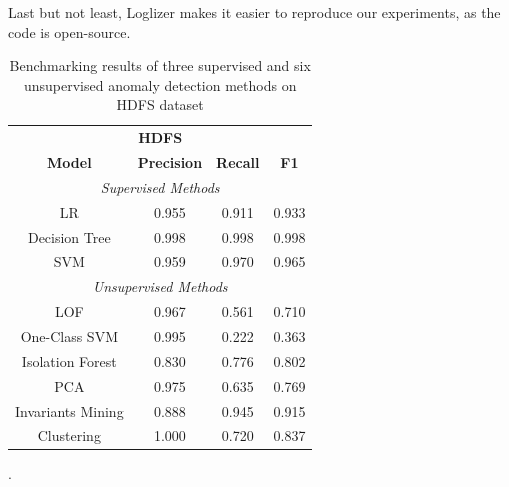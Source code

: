 Last but not least, Loglizer makes it easier to reproduce our experiments, as the code is open-source.

\begin{table}[h]
\centering
\begin{tabular}{@{}cccc@{}}
\toprule
\multicolumn{4}{c}{\textbf{HDFS}} \\ 
\textbf{Model}    & \textbf{Precision} & \textbf{Recall} & \textbf{F1} \\  \toprule \midrule
\multicolumn{4}{c}{\textit{Supervised Methods}}                        \\ \midrule
LR                & 0.955              & 0.911           & 0.933       \\
Decision Tree     & 0.998              & 0.998           & 0.998       \\
SVM               & 0.959              & 0.970           & 0.965       \\ \midrule
\multicolumn{4}{c}{\textit{Unsupervised Methods}}                      \\ \midrule
LOF      & 0.967              & 0.561           & 0.710       \\
One-Class SVM     & 0.995              & 0.222           & 0.363       \\
Isolation Forest  & 0.830              & 0.776           & 0.802       \\
PCA               & 0.975              & 0.635           & 0.769       \\
Invariants Mining & 0.888              & 0.945           & 0.915       \\
Clustering        & 1.000              & 0.720           & 0.837       \\ \bottomrule
\end{tabular}
\caption{Benchmarking results of three supervised and six unsupervised anomaly detection methods on HDFS dataset \cite{he2016}}.
\label{table:loglizer}
\end{table}

